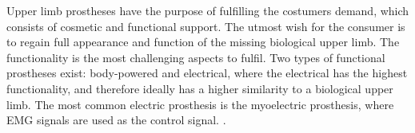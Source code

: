 
Upper limb prostheses have the purpose of fulfilling the costumers demand, which consists of cosmetic and functional support. The utmost wish for the consumer is to regain full appearance and function of the missing biological upper limb. The functionality is the most challenging aspects to fulfil. Two types of functional prostheses exist: body-powered and electrical, where the electrical has the highest functionality, and therefore ideally has a higher similarity to a biological upper limb. The most common electric prosthesis is the myoelectric prosthesis, where EMG signals are used as the control signal. \cite{jiang2012}. 

